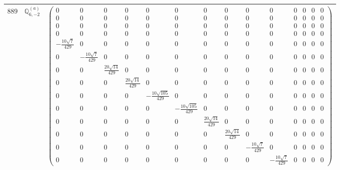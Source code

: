 \documentclass[fleqn,8pt,landscape]{jsarticle}
\begin{document}
\begin{center}
\begin{longtable}{ccc}
$ 889 $ & $ \mathbb{Q}_{6,-2}^{(a)} $ & $ \begin{pmatrix} 0 & 0 & 0 & 0 & 0 & 0 & 0 & 0 & 0 & 0 & 0 & 0 & 0 & 0 \\ 0 & 0 & 0 & 0 & 0 & 0 & 0 & 0 & 0 & 0 & 0 & 0 & 0 & 0 \\ 0 & 0 & 0 & 0 & 0 & 0 & 0 & 0 & 0 & 0 & 0 & 0 & 0 & 0 \\ 0 & 0 & 0 & 0 & 0 & 0 & 0 & 0 & 0 & 0 & 0 & 0 & 0 & 0 \\ - \frac{10 \sqrt{7}}{429} & 0 & 0 & 0 & 0 & 0 & 0 & 0 & 0 & 0 & 0 & 0 & 0 & 0 \\ 0 & - \frac{10 \sqrt{7}}{429} & 0 & 0 & 0 & 0 & 0 & 0 & 0 & 0 & 0 & 0 & 0 & 0 \\ 0 & 0 & \frac{20 \sqrt{14}}{429} & 0 & 0 & 0 & 0 & 0 & 0 & 0 & 0 & 0 & 0 & 0 \\ 0 & 0 & 0 & \frac{20 \sqrt{14}}{429} & 0 & 0 & 0 & 0 & 0 & 0 & 0 & 0 & 0 & 0 \\ 0 & 0 & 0 & 0 & - \frac{10 \sqrt{105}}{429} & 0 & 0 & 0 & 0 & 0 & 0 & 0 & 0 & 0 \\ 0 & 0 & 0 & 0 & 0 & - \frac{10 \sqrt{105}}{429} & 0 & 0 & 0 & 0 & 0 & 0 & 0 & 0 \\ 0 & 0 & 0 & 0 & 0 & 0 & \frac{20 \sqrt{14}}{429} & 0 & 0 & 0 & 0 & 0 & 0 & 0 \\ 0 & 0 & 0 & 0 & 0 & 0 & 0 & \frac{20 \sqrt{14}}{429} & 0 & 0 & 0 & 0 & 0 & 0 \\ 0 & 0 & 0 & 0 & 0 & 0 & 0 & 0 & - \frac{10 \sqrt{7}}{429} & 0 & 0 & 0 & 0 & 0 \\ 0 & 0 & 0 & 0 & 0 & 0 & 0 & 0 & 0 & - \frac{10 \sqrt{7}}{429} & 0 & 0 & 0 & 0 \end{pmatrix} $ \\ \hline

\end{longtable}
\end{center}
\end{document}

